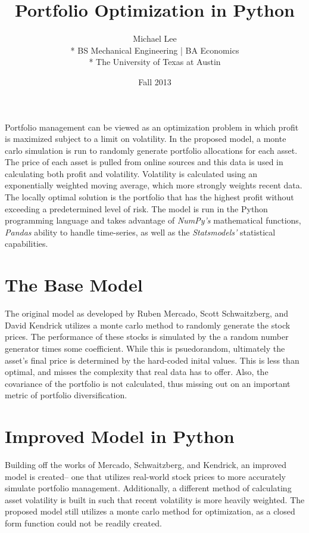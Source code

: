 \documentclass[12pt]{article}
\title{Portfolio Optimization in Python}
\author{Michael Lee \\*
BS Mechanical Engineering | BA Economics \\*
The University of Texas at Austin}
\date{Fall 2013}
\begin{document}
\maketitle{}
Portfolio management can be viewed as an optimization problem in which profit is maximized subject to a limit on volatility. In the proposed model, a monte carlo simulation is run to randomly generate portfolio allocations for each asset. The price of each asset is pulled from online sources and this data is used in calculating both profit and volatility. Volatility is calculated using an exponentially weighted moving average, which more strongly weights recent data. The locally optimal solution is the portfolio that has the highest profit without exceeding a predetermined level of risk. The model is run in the Python programming language and takes advantage of \emph{NumPy's} mathematical functions, \emph{Pandas} ability to handle time-series, as well as the \emph{Statsmodels'} statistical capabilities.

\newpage
\section{The Base Model}
The original model as developed by Ruben Mercado, Scott Schwaitzberg, and David Kendrick utilizes a monte carlo method to randomly generate the stock prices. The performance of these stocks is simulated by the a random number generator times some coefficient. While this is psuedorandom, ultimately the asset's final price is determined by the hard-coded inital values. This is less than optimal, and misses the complexity that real data has to offer. Also, the covariance of the portfolio is not calculated, thus missing out on an important metric of portfolio diversification. 


\section{Improved Model in Python}
Building off the works of Mercado, Schwaitzberg, and Kendrick, an improved model is created-- one that utilizes real-world stock prices to more accurately simulate portfolio management. Additionally, a different method of calculating asset volatility is built in such that recent volatility is more heavily weighted. The proposed model still utilizes a monte carlo method for optimization, as a closed form function could not be readily created.
\end{document}
